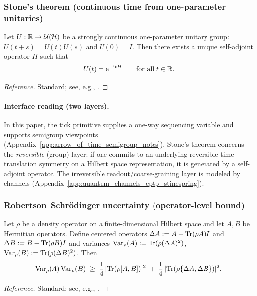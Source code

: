 \subsubsection{Stone's theorem (continuous time from one-parameter unitaries)}
\begin{theorem}
\label{thm:z128_stone}
Let $U:\mathbb{R}\to \mathcal{U}(\mathcal{H})$ be a strongly continuous one-parameter unitary group: $U(t+s)=U(t)U(s)$ and $U(0)=I$.
Then there exists a unique self-adjoint operator $H$ such that
\[
U(t)=\mathrm{e}^{-\mathrm{i} tH}
\qquad\text{for all }t\in\mathbb{R}.
\]
\end{theorem}
\begin{proof}[Reference]
Standard; see, e.g., \cite{Stone1932}.
\end{proof}

\paragraph{Interface reading (two layers).}
\InterfaceTag In this paper, the tick primitive supplies a one-way sequencing variable and supports semigroup viewpoints (Appendix~\ref{app:arrow_of_time_semigroup_notes}).
Stone's theorem concerns the \emph{reversible} (group) layer: if one commits to an underlying reversible time-translation symmetry on a Hilbert space representation, it is generated by a self-adjoint operator.
The irreversible readout/coarse-graining layer is modeled by channels (Appendix~\ref{app:quantum_channels_cptp_stinespring}).

\subsubsection{Robertson--Schr\"odinger uncertainty (operator-level bound)}
\begin{proposition}
\label{prop:z128_robertson_schrodinger}
Let $\rho$ be a density operator on a finite-dimensional Hilbert space and let $A,B$ be Hermitian operators.
Define centered operators $\Delta A:=A-\mathrm{Tr}(\rho A)I$ and $\Delta B:=B-\mathrm{Tr}(\rho B)I$ and variances
$\mathrm{Var}_\rho(A):=\mathrm{Tr}(\rho(\Delta A)^2)$, $\mathrm{Var}_\rho(B):=\mathrm{Tr}(\rho(\Delta B)^2)$.
Then
\[
\mathrm{Var}_\rho(A)\,\mathrm{Var}_\rho(B)\;\ge\;
\frac{1}{4}\,|\mathrm{Tr}(\rho[A,B])|^2
\;+\;
\frac{1}{4}\,|\mathrm{Tr}(\rho\{\Delta A,\Delta B\})|^2.
\]
\end{proposition}
\begin{proof}[Reference]
Standard; see, e.g., \cite{Robertson1929,Schrodinger1930}.
\end{proof}

